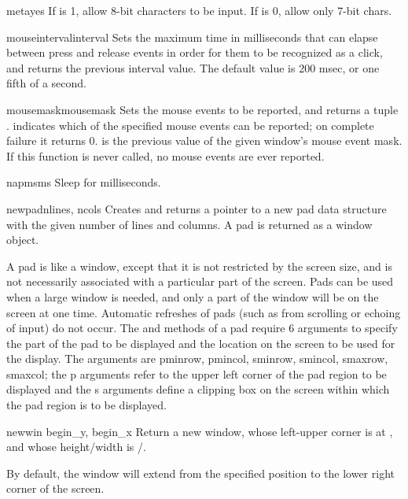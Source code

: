\begin{funcdesc}{meta}{yes}
If  is 1, allow 8-bit characters to be input. If  is 0, 
allow only 7-bit chars.
\end{funcdesc}

\begin{funcdesc}{mouseinterval}{interval}
Sets the maximum time in milliseconds that can elapse between press and
release events in order for them to be recognized as a click, and
returns the previous interval value.  The default value is 200 msec,
or one fifth of a second.
\end{funcdesc}

\begin{funcdesc}{mousemask}{mousemask}
Sets the mouse events to be reported, and returns a tuple
.  
 indicates which of the
specified mouse events can be reported; on complete failure it returns
0.   is the previous value of the given window's mouse
event mask.  If this function is never called, no mouse events are
ever reported.
\end{funcdesc}

\begin{funcdesc}{napms}{ms}
Sleep for  milliseconds.
\end{funcdesc}

\begin{funcdesc}{newpad}{nlines, ncols}
Creates and returns a pointer to a new pad data structure with the
given number of lines and columns.  A pad is returned as a
window object.

A pad is like a window, except that it is not restricted by the screen
size, and is not necessarily associated with a particular part of the
screen.  Pads can be used when a large window is needed, and only a
part of the window will be on the screen at one time.  Automatic
refreshes of pads (such as from scrolling or echoing of input) do not
occur.  The  and  methods of a
pad require 6 arguments to specify the part of the pad to be
displayed and the location on the screen to be used for the display.
The arguments are pminrow, pmincol, sminrow, smincol, smaxrow,
smaxcol; the p arguments refer to the upper left corner of the pad
region to be displayed and the s arguments define a clipping box on
the screen within which the pad region is to be displayed.
\end{funcdesc}

\begin{funcdesc}{newwin}{ begin_y, begin_x}
Return a new window, whose left-upper corner is at 
, and whose height/width is 
/.  

By default, the window will extend from the 
specified position to the lower right corner of the screen.
\end{funcdesc}

